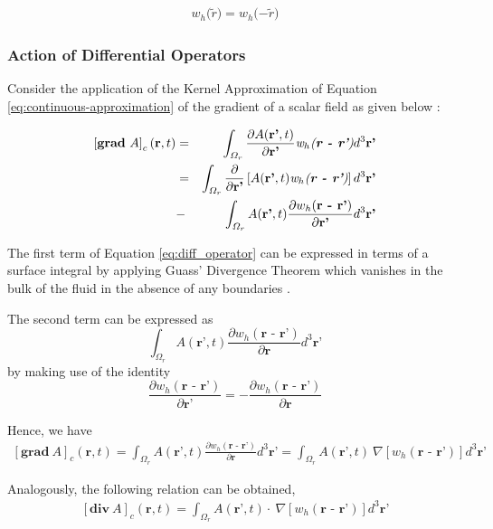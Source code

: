  \begin{eqnarray}\label{eq:kernel-symmetry}
  \textit{w$_h(\widetilde{r}$)} = \textit{w$_h(-\widetilde{r}$)}
 \end{eqnarray}

\subsubsection{Action of Differential Operators}

 Consider the application of the Kernel Approximation of Equation \eqref{eq:continuous-approximation} of the gradient of a scalar field as given below \cite{sph:volieu}: 
 
 \begin{eqnarray} \label{eq:diff_operator}
 \left[\textbf{grad}~A\right]_{c}(\textbf{r},t) &=& \int_{\varOmega_r} \frac{\partial A(\textbf{r'},t)}{\partial \textbf{r'}} \textit{w$_h$(\textbf{r - r'})} d^{3}\textbf{r'} \nonumber\\
 &=& \int_{\varOmega_r} \frac{\partial}{\partial \textbf{r'}}\left[A(\textbf{r'},t) \textit{w$_h$(\textbf{r - r'})} \right]d^{3}\textbf{r'} \\
 &-& \int_{\varOmega_r} A(\textbf{r'},t) \frac{\partial w_h(\textbf{r - r'}) }{\partial \textbf{r'}} d^{3}\textbf{r'} \nonumber
 \end{eqnarray}
 
 The first term of Equation \eqref{eq:diff_operator} can be expressed in terms of a surface integral by applying Guass' Divergence Theorem which vanishes in the bulk of the fluid in the absence of any boundaries \cite{sph:volieu}. 
 
 The second term can be expressed as $$\int_{\varOmega_r} A(\textbf{r'},t) \frac{\partial w_h(\textbf{r - r'}) }{\partial \textbf{r}} d^{3}\textbf{r'}$$ by making use of the identity $$\frac{\partial w_h(\textbf{r - r'}) }{\partial \textbf{r'}} = -\frac{\partial w_h(\textbf{r - r'}) }{\partial \textbf{r}}$$
 
 Hence, we have 
 \begin{eqnarray}\label{eq:grad}
 \left[\textbf{grad}~A\right]_{c}(\textbf{r},t) = \int_{\varOmega_r} A(\textbf{r'},t) \frac{\partial w_h(\textbf{r - r'}) }{\partial \textbf{r}} d^{3}\textbf{r'} = \int_{\varOmega_r} A(\textbf{r'},t) ~\nabla\left[w_h(\textbf{r - r'})\right] d^{3}\textbf{r'} 
 \end{eqnarray}  
 
 Analogously, the following relation can be obtained, 
 \begin{eqnarray}\label{eq:div}
 \left[\textbf{div}~A\right]_{c}(\textbf{r},t) =  \int_{\varOmega_r} A(\textbf{r'},t) \cdot ~\nabla \left[w_h(\textbf{r - r'})\right] d^{3}\textbf{r'} 
 \end{eqnarray}
 
